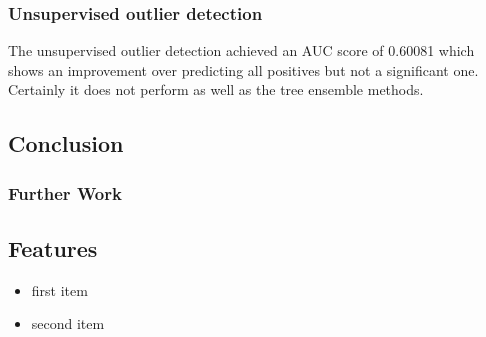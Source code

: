 \documentclass[a4paper, 11pt, twocolumn]{report}
\begin{document}
\subsection{Unsupervised outlier detection}
The unsupervised outlier detection achieved an AUC score of 0.60081 which shows an improvement over predicting all positives but not a significant one. 
Certainly it does not perform as well as the tree ensemble methods.

\section{Conclusion}

\subsection{Further Work}










\begin{appendices}

\chapter{Features}

\begin{itemize} \itemsep0.5pt \parskip0pt  \ttfamily \small \bfseries
  \item[] first item
  \item[] second item
\end{itemize}

\end{appendices}

\printbibliography
\end{document}
